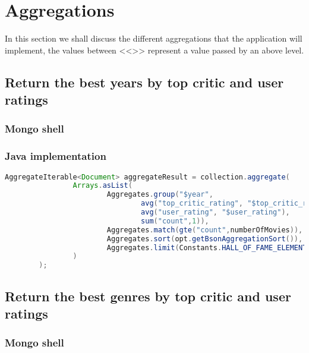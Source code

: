 \section{Aggregations}
In this section we shall discuss the different aggregations that the application will implement, the values between <<>> represent a value passed by an above level.

\subsection{Return the best years by top critic and user ratings}\label{subsec:bestYear}
\subsubsection{Mongo shell}

\subsubsection{Java implementation}
\begin{lstlisting}[language=Java, caption = MovieMongoDBDAO.java]
AggregateIterable<Document> aggregateResult = collection.aggregate(
                Arrays.asList(
                        Aggregates.group("$year",
                                avg("top_critic_rating", "$top_critic_rating"),
                                avg("user_rating", "$user_rating"),
                                sum("count",1)),
                        Aggregates.match(gte("count",numberOfMovies)),
                        Aggregates.sort(opt.getBsonAggregationSort()),
                        Aggregates.limit(Constants.HALL_OF_FAME_ELEMENT_NUMBERS)
                )
        );
\end{lstlisting}
\subsection{Return the best genres by top critic and user ratings}\label{subsec:HOFGenres}
\subsubsection{Mongo shell}

